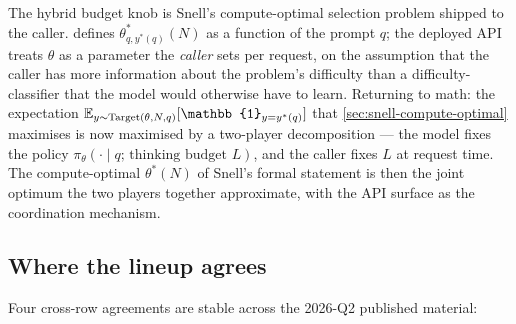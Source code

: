 \begin{intuition}
The hybrid budget knob is Snell's compute-optimal selection problem
shipped to the caller.  defines
$\theta^\ast_{q, y^\ast(q)}(N)$ as a function of the prompt $q$;
the deployed API treats $\theta$ as a parameter the \emph{caller}
sets per request, on the assumption that the caller has more
information about the problem's difficulty than a difficulty-classifier
that the model would otherwise have to learn. Returning to math: the
expectation
$\E_{y \sim \mathrm{Target}(\theta, N, q)}[\mathbb{1}_{y = y^\ast(q)}]$
that \cref{sec:snell-compute-optimal} maximises is now maximised by a
two-player decomposition --- the model fixes the policy
$\pi_\theta(\cdot \mid q;\, \text{thinking budget } L)$, and the
caller fixes $L$ at request time. The compute-optimal $\theta^\ast(N)$
of Snell's formal statement is then the joint optimum the two players
together approximate, with the API surface as the coordination
mechanism.
\end{intuition}

\subsection{Where the lineup agrees}
\label{sec:frontier-agree}

Four cross-row agreements are stable across the 2026-Q2 published
material:

